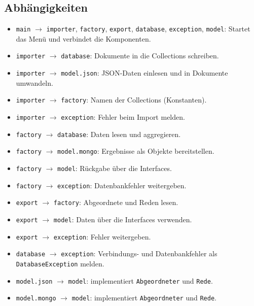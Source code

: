 \subsection{Abhängigkeiten}
\begin{itemize}
    \item \texttt{main} $\rightarrow$ \texttt{importer}, \texttt{factory}, \texttt{export}, \texttt{database}, \texttt{exception}, \texttt{model}: Startet das Menü und verbindet die Komponenten.
    \item \texttt{importer} $\rightarrow$ \texttt{database}: Dokumente in die Collections schreiben.
    \item \texttt{importer} $\rightarrow$ \texttt{model.json}: JSON-Daten einlesen und in Dokumente umwandeln.
    \item \texttt{importer} $\rightarrow$ \texttt{factory}: Namen der Collections (Konstanten).
    \item \texttt{importer} $\rightarrow$ \texttt{exception}: Fehler beim Import melden.
    \item \texttt{factory} $\rightarrow$ \texttt{database}: Daten lesen und aggregieren.
    \item \texttt{factory} $\rightarrow$ \texttt{model.mongo}: Ergebnisse als Objekte bereitstellen.
    \item \texttt{factory} $\rightarrow$ \texttt{model}: Rückgabe über die Interfaces.
    \item \texttt{factory} $\rightarrow$ \texttt{exception}: Datenbankfehler weitergeben.
    \item \texttt{export} $\rightarrow$ \texttt{factory}: Abgeordnete und Reden lesen.
    \item \texttt{export} $\rightarrow$ \texttt{model}: Daten über die Interfaces verwenden.
    \item \texttt{export} $\rightarrow$ \texttt{exception}: Fehler weitergeben.
    \item \texttt{database} $\rightarrow$ \texttt{exception}: Verbindungs- und Datenbankfehler als \texttt{DatabaseException} melden.
    \item \texttt{model.json} $\rightarrow$ \texttt{model}: implementiert \texttt{Abgeordneter} und \texttt{Rede}.
    \item \texttt{model.mongo} $\rightarrow$ \texttt{model}: implementiert \texttt{Abgeordneter} und \texttt{Rede}.
\end{itemize}

